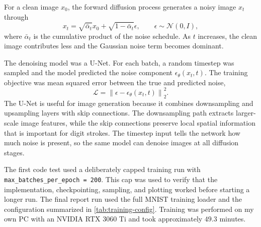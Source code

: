 For a clean image $x_0$, the forward diffusion process generates a noisy image $x_t$ through
\begin{equation*}
    x_t = \sqrt{\bar{\alpha}_t}x_0 + \sqrt{1-\bar{\alpha}_t}\epsilon,
    \qquad
    \epsilon \sim \mathcal{N}(0,I),
\end{equation*}
where $\bar{\alpha}_t$ is the cumulative product of the noise schedule.
As $t$ increases, the clean image contributes less and the Gaussian noise term becomes dominant.

The denoising model was a U-Net.
For each batch, a random timestep was sampled and the model predicted the noise component
\(\epsilon_\theta(x_t,t)\).
The training objective was mean squared error between the true and predicted noise,
\begin{equation*}
    \mathcal{L}
    =
    \left\lVert \epsilon - \epsilon_\theta(x_t,t) \right\rVert_2^2.
\end{equation*}
The U-Net is useful for image generation because it combines downsampling and upsampling layers with skip connections.
The downsampling path extracts larger-scale image features, while the skip connections preserve local spatial information that is important for digit strokes.
The timestep input tells the network how much noise is present, so the same model can denoise images at all diffusion stages.

The first code test used a deliberately capped training run with \texttt{max\_batches\_per\_epoch = 200}.
This cap was used to verify that the implementation, checkpointing, sampling, and plotting worked before starting a longer run.
The final report run used the full MNIST training loader and the configuration summarized in \autoref{tab:training-config}.
Training was performed on my own PC with an NVIDIA RTX 3060 Ti and took approximately \(49.3\) minutes.

